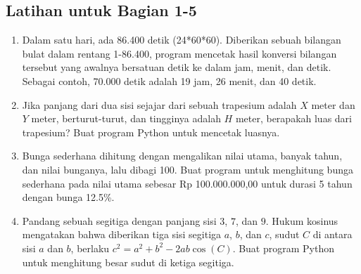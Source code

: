 \documentclass[14pt]{extarticle}
\begin{document}
\subsection{Latihan untuk Bagian 1-5}

\begin{enumerate}
	\item Dalam satu hari, ada 86.400 detik (24*60*60). Diberikan sebuah bilangan bulat dalam rentang 1-86.400, program mencetak hasil konversi bilangan tersebut yang awalnya bersatuan detik ke dalam jam, menit, dan detik. Sebagai contoh, 70.000 detik adalah 19 jam, 26 menit, dan 40 detik.
	\item Jika panjang dari dua sisi sejajar dari sebuah trapesium adalah $X$ meter dan $Y$ meter, berturut-turut, dan tingginya adalah $H$ meter, berapakah luas dari trapesium? Buat program Python untuk mencetak luasnya.
	\item Bunga sederhana dihitung dengan mengalikan nilai utama, banyak tahun, dan nilai bunganya, lalu dibagi 100. Buat program untuk menghitung bunga sederhana pada nilai utama sebesar Rp 100.000.000,00 untuk durasi 5 tahun dengan bunga 12.5\%.
	\item Pandang sebuah segitiga dengan panjang sisi $3$, $7$, dan $9$. Hukum kosinus mengatakan bahwa diberikan tiga sisi segitiga $a$, $b$, dan $c$, sudut $C$ di antara sisi $a$ dan $b$, berlaku $c^2=a^2+b^2-2ab \cos(C)$. Buat program Python untuk menghitung besar sudut di ketiga segitiga.
	

\end{enumerate}
\end{document}
